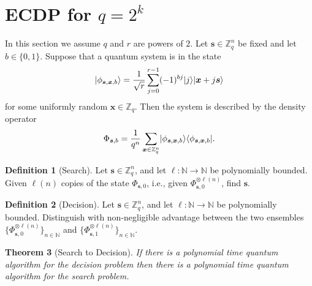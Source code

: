 \documentclass[11pt]{article}
\theoremstyle{plain}
\newtheorem{theorem}{Theorem}
\theoremstyle{definition}
\newtheorem{definition}[theorem]{Definition}
\DeclarePairedDelimiter{\ldbrac}{\lvert}{\rangle}
\DeclarePairedDelimiter{\rdbrac}{\langle}{\rvert}
\def\N{\ensuremath{\mathbb{N}}}
\def\Z{\ensuremath{\mathbb{Z}}}
\begin{document}



\section{ECDP for \boldmath${q = 2^k}$\unboldmath}


In this section we assume $q$ and $r$ are powers of $2$. Let $\bm{s} \in \Z_q^n$ be fixed and let $b \in \{ 0, 1 \}$. Suppose that a quantum system is in the state 
\[ \ldbrac{\phi_{\bm{s}, \bm{x}, b}} = \frac{1}{\sqrt{r}} \sum_{j = 0}^{r - 1} (-1)^{bj}\ldbrac{j}\ldbrac{\bm{x} + j\bm{s}} \]
for some uniformly random $\bm{x} \in \Z_q$. Then the  system is described by the density operator  
\[ \Phi_{\bm{s}, b} = \frac{1}{q^n} \sum_{\bm{x} \in \Z_q^n} \ldbrac{\phi_{\bm{s}, \bm{x}, b}} \rdbrac{\phi_{\bm{s}, \bm{x}, b}}. \]
\begin{definition}[Search]
    Let $\bm{s} \in \Z_q^n$, and let $\ell: \N \rightarrow \N$ be polynomially bounded. Given $\ell(n)$ copies of the state $\Phi_{\bm{s}, 0}$, i.e., given $\Phi_{\bm{s}, 0}^{\otimes \ell(n)}$, find $\bm{s}$.
\end{definition}
\begin{definition}[Decision]
    Let $\bm{s} \in \Z_q^n$, and let $\ell: \N \rightarrow \N$ be polynomially bounded. Distinguish with non-negligible advantage between the two ensembles $\{ \Phi_{\bm{s}, 0}^{\otimes \ell(n)} \}_{n \in \N}$ and $\{ \Phi_{\bm{s}, 1}^{\otimes \ell(n)} \}_{n \in \N}$.
\end{definition}
\begin{theorem}[Search to Decision]
    If there is a polynomial time quantum algorithm for the decision problem then there is a polynomial time quantum algorithm for the search problem.
\end{theorem}
\end{document}
